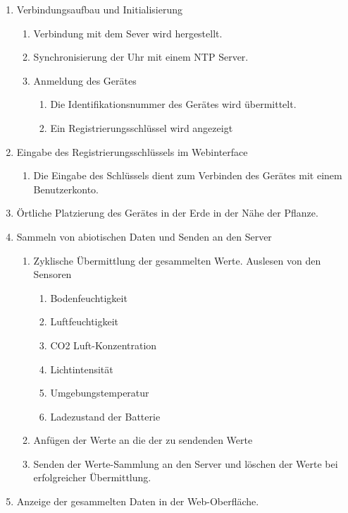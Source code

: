 \documentclass[pointlessnumbers]{scrartcl}
\begin{document}
\begin{enumerate}
    \item Verbindungsaufbau und Initialisierung
    \begin{enumerate}
        \item Verbindung mit dem Sever wird hergestellt. 
        \item Synchronisierung der Uhr mit einem NTP Server. 
        \item Anmeldung des Gerätes 
            \begin{enumerate}
                \item Die Identifikationsnummer des Gerätes wird übermittelt. 
                \item Ein Registrierungsschlüssel wird angezeigt             
            \end{enumerate}
    \end{enumerate}      
        
    \item Eingabe des Registrierungsschlüssels im Webinterface    
    \begin{enumerate}
        \item Die Eingabe des Schlüssels dient zum Verbinden des Gerätes mit einem Benutzerkonto.  
    \end{enumerate}
    
    \item Örtliche Platzierung des Gerätes in der Erde in der Nähe der Pflanze.  
    
    \item Sammeln von abiotischen Daten und Senden an den Server
    \begin{enumerate}
    \item Zyklische Übermittlung der gesammelten Werte. Auslesen von den Sensoren 
        \begin{enumerate}
        \item Bodenfeuchtigkeit 
        \item Luftfeuchtigkeit 
        \item CO2 Luft-Konzentration 
        \item Lichtintensität 
        \item Umgebungstemperatur 
        \item Ladezustand der Batterie 
        \end{enumerate}
    \item Anfügen der Werte an die der zu sendenden Werte 
    \item Senden der Werte-Sammlung an den Server und löschen der Werte bei erfolgreicher Übermittlung.
    \end{enumerate}
    
    \item Anzeige der gesammelten Daten in der Web-Oberfläche.
  
\end{enumerate}
  
\end{document}
